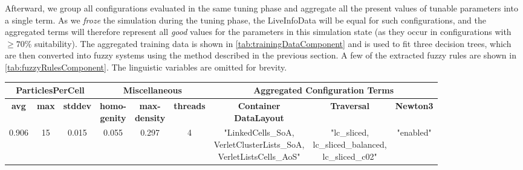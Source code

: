 Afterward, we group all configurations evaluated in the same tuning phase and aggregate all the present values of tunable parameters into a single term. As we \emph{froze} the simulation during the tuning phase, the LiveInfoData will be equal for such configurations, and the aggregated terms will therefore represent all \emph{good} values for the parameters in this simulation state (as they occur in configurations with $\geq 70\%$ suitability). The aggregated training data is shown in \autoref{tab:trainingDataComponent} and is used to fit three decision trees, which are then converted into fuzzy systems using the method described in the previous section. A few of the extracted fuzzy rules are shown in \autoref{tab:fuzzyRulesComponent}. The linguistic variables are omitted for brevity.

\begin{table}[H]
    \centering
    \tiny
    \def\arraystretch{2.5}
    \begin{tabular}{|c|c|c|c|c|c|c|c|c|}
        \cline{1-9}
        \multicolumn{3}{|c|}{ \textbf{ParticlesPerCell}} & \multicolumn{3}{c|}{\textbf{Miscellaneous}} & \multicolumn{3}{c|}{\textbf{Aggregated Configuration Terms}}                                                                                                                               \\
        \hline
        \textbf{avg}                                     & \textbf{max}                                & \textbf{stddev}                                              & \tabularCenterstack{c}{\textbf{homo-}                                                                                       \\ \textbf{genity}} & \tabularCenterstack{c}{\textbf{max-} \\ \textbf{density}} & \textbf{threads} & \tabularCenterstack{c}{\textbf{Container} \\ \textbf{DataLayout}}& \textbf{Traversal} & \textbf{Newton3}  \\
        \hline
        0.906                                            & 15                                          & 0.015                                                        & 0.055                                 & 0.297  & 4      & \tabularCenterstack{c}{"LinkedCells\_SoA,                         \\ VerletClusterLists\_SoA, \\ VerletListsCells\_AoS"} & \tabularCenterstack{c}{"lc\_sliced, \\ lc\_sliced\_balanced, \\ lc\_sliced\_c02"} & "enabled"   \\

\end{tabular}
\end{table}

